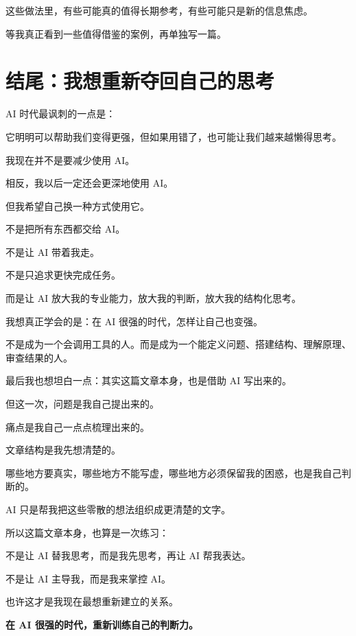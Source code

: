 \documentclass[UTF8,zihao=-4,a4paper]{ctexart}
\begin{document}
这些做法里，有些可能真的值得长期参考，有些可能只是新的信息焦虑。

等我真正看到一些值得借鉴的案例，再单独写一篇。

\section*{结尾：我想重新夺回自己的思考}
AI 时代最讽刺的一点是：

它明明可以帮助我们变得更强，但如果用错了，也可能让我们越来越懒得思考。

我现在并不是要减少使用 AI。

相反，我以后一定还会更深地使用 AI。

但我希望自己换一种方式使用它。

不是把所有东西都交给 AI。\par
不是让 AI 带着我走。\par
不是只追求更快完成任务。

而是让 AI 放大我的专业能力，放大我的判断，放大我的结构化思考。

我想真正学会的是：在 AI 很强的时代，怎样让自己也变强。

不是成为一个会调用工具的人。而是成为一个能定义问题、搭建结构、理解原理、审查结果的人。

最后我也想坦白一点：其实这篇文章本身，也是借助 AI 写出来的。

但这一次，问题是我自己提出来的。\par
痛点是我自己一点点梳理出来的。\par
文章结构是我先想清楚的。\par
哪些地方要真实，哪些地方不能写虚，哪些地方必须保留我的困惑，也是我自己判断的。

AI 只是帮我把这些零散的想法组织成更清楚的文字。

所以这篇文章本身，也算是一次练习：

不是让 AI 替我思考，而是我先思考，再让 AI 帮我表达。\par
不是让 AI 主导我，而是我来掌控 AI。

也许这才是我现在最想重新建立的关系。

\vspace{1em}
\begin{leadbox}
\centering\sffamily\bfseries\color{PrimaryDark}
在 AI 很强的时代，重新训练自己的判断力。
\end{leadbox}
\end{document}

